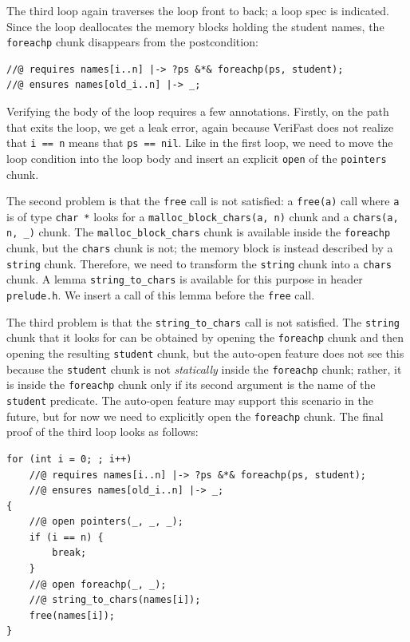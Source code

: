 \documentclass{article}
\begin{document}
The third loop again traverses the loop front to back; a loop
spec is indicated. Since the loop deallocates the memory blocks
holding the student names, the \lstinline!foreachp! chunk
disappears from the postcondition:
\begin{lstlisting}
//@ requires names[i..n] |-> ?ps &*& foreachp(ps, student);
//@ ensures names[old_i..n] |-> _;
\end{lstlisting}
Verifying the body of the loop requires a few annotations.
Firstly, on the path that exits the loop, we get a leak error,
again because VeriFast does not realize that \lstinline!i == n!
means that \lstinline!ps == nil!. Like in the first loop, we
need to move the loop condition into the loop body and insert
an explicit \lstinline!open! of the \lstinline!pointers! chunk.

The second problem is that the \lstinline!free! call is not
satisfied: a \lstinline!free(a)! call where \lstinline!a! is of
type \lstinline!char *! looks for a
\lstinline!malloc_block_chars(a, n)! chunk and a
\lstinline!chars(a, n, _)! chunk. The
\lstinline!malloc_block_chars! chunk is available inside the
\lstinline!foreachp! chunk, but the \lstinline!chars! chunk is
not; the memory block is instead described by a
\lstinline!string! chunk. Therefore, we need to transform the
\lstinline!string! chunk into a \lstinline!chars! chunk. A
lemma \lstinline!string_to_chars! is available for this purpose
in header \lstinline!prelude.h!. We insert a call of this lemma
before the \lstinline!free! call.

The third problem is that the \lstinline!string_to_chars! call
is not satisfied. The \lstinline!string! chunk that it looks
for can be obtained by opening the \lstinline!foreachp! chunk
and then opening the resulting \lstinline!student! chunk, but
the auto-open feature does not see this because the
\lstinline!student! chunk is not \emph{statically} inside the
\lstinline!foreachp! chunk; rather, it is inside the
\lstinline!foreachp! chunk only if its second argument is the
name of the \lstinline!student! predicate. The auto-open
feature may support this scenario in the future, but for now we
need to explicitly open the \lstinline!foreachp! chunk. The
final proof of the third loop looks as follows:
\begin{lstlisting}
for (int i = 0; ; i++)
    //@ requires names[i..n] |-> ?ps &*& foreachp(ps, student);
    //@ ensures names[old_i..n] |-> _;
{
    //@ open pointers(_, _, _);
    if (i == n) {
        break;
    }
    //@ open foreachp(_, _);
    //@ string_to_chars(names[i]);
    free(names[i]);
}
\end{lstlisting}
\end{document}

